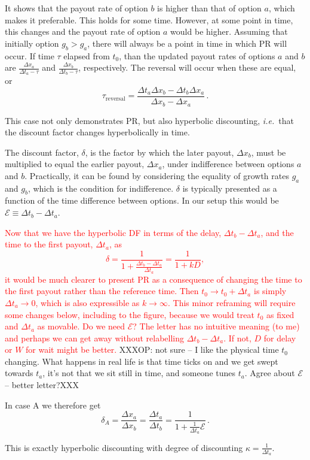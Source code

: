 \documentclass[11pt]{article}
\newcommand{\ie}{{\it i.e.}\ }
\newcommand{\be}{\begin{equation}}
\newcommand{\ee}{\end{equation}}
\newcommand{\Dt}{\Delta t}
\newcommand{\Dx}{\Delta x}
\newcommand{\Epsilon}{\mathcal{E}}
\numberwithin{equation}{section}
\begin{document}
It shows that the payout rate of option $b$ is higher than that of option $a$, which makes it preferable. This holds for some time. However, at some point in time, this changes and the payout rate of option $a$ would be higher. Assuming that initially option $g_b > g_a$, there will always be a point in time in which PR will occur. If time $\tau$ elapsed from $t_0$, than the updated payout rates of options $a$ and $b$ are $\frac{\Dx_a}{\Dt_a - \tau}$ and $\frac{\Dx_b}{\Dt_b - \tau}$, respectively. The reversal will occur when these are equal, or
\be
\tau_{\text{reversal}} = \frac{\Dt_a\Dx_b - \Dt_b\Dx_a}{\Dx_b - \Dx_a}\,.
\ee

This case not only demonstrates PR, but also hyperbolic discounting, \ie that the discount factor changes hyperbolically in time.

The discount factor, $\delta$, is the factor by which the later payout, $\Dx_b$, must be multiplied to equal the earlier payout, $\Dx_a$, under indifference between options $a$ and $b$. Practically, it can be found by considering the equality of growth rates $g_a$ and $g_b$, which is the condition for indifference. $\delta$ is typically presented as a function of the time difference between options. In our setup this would be $\Epsilon \equiv \Dt_b - \Dt_a$.

\textcolor{red}{
Now that we have the hyperbolic DF in terms of the delay, $\Dt_b-\Dt_a$, and the time to the first payout, $\Dt_a$, as
\be
\delta = \frac{1}{1+\frac{\Dt_b-\Dt_a}{\Dt_a}} = \frac{1}{1+kD},
\ee
it would be much clearer to present PR as a consequence of changing the time to the first payout rather than the reference time. Then $t_0\to t_0+\Dt_a$ is simply $\Dt_a\to0$, which is also expressible as $k\to\infty$. This minor reframing will require some changes below, including to the figure, because we would treat $t_0$ as fixed and $\Dt_a$ as movable.
}
\textcolor{red}{
Do we need $\Epsilon$? The letter has no intuitive meaning (to me) and perhaps we can get away without relabelling $\Dt_b-\Dt_a$. If not, $D$ for delay or $W$ for wait might be better.
}
XXXOP: not sure -- I like the physical time $t_0$ changing. What happens in real life is that time ticks on and we get swept towards $t_a$, it's not that we sit still in time, and someone tunes $t_a$. Agree about $\Epsilon$ -- better letter?XXX


In case A we therefore get
\be
\delta_A = \frac{\Dx_a}{\Dx_b} = \frac{\Dt_a}{\Dt_b} = \frac{1}{1+\frac{1}{\Dt_a} \Epsilon}\,.
\ee

This is exactly hyperbolic discounting with degree of discounting $\kappa = \frac{1}{\Dt_a}$.
\end{document}
